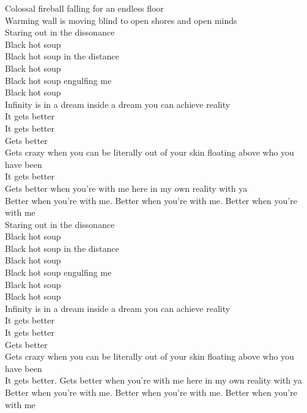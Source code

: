 Colossal fireball falling for an endless floor \\
Warming wall is moving blind to open shores and open minds \\

Staring out in the dissonance \\
Black hot soup \\
Black hot soup in the distance \\
Black hot soup \\
Black hot soup engulfing me \\
Black hot soup \\

Infinity is in a dream inside a dream you can achieve reality \\
It gets better \\
It gets better \\
Gets better \\
Gets crazy when you can be literally out of your skin floating above who you have been \\
It gets better \\
Gets better when you're with me here in my own reality with ya \\
Better when you're with me. Better when you're with me. Better when you're with me \\

Staring out in the dissonance \\
Black hot soup \\
Black hot soup in the distance \\
Black hot soup \\
Black hot soup engulfing me \\
Black hot soup \\

Black hot soup \\

Infinity is in a dream inside a dream you can achieve reality \\
It gets better \\
It gets better \\
Gets better \\
Gets crazy when you can be literally out of your skin floating above who you have been \\
It gets better. Gets better when you're with me here in my own reality with ya \\
Better when you're with me. Better when you're with me. Better when you're with me \\

